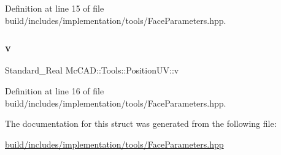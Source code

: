 Definition at line 15 of file build/includes/implementation/tools/\+Face\+Parameters.\+hpp.

\mbox{\label{structMcCAD_1_1Tools_1_1PositionUV_a01f73f82047d1bf01cbb494fde5451e5}} 
\subsubsection{\texorpdfstring{v}{v}}
{\footnotesize\ttfamily Standard\+\_\+\+Real Mc\+C\+A\+D\+::\+Tools\+::\+Position\+U\+V\+::v}



Definition at line 16 of file build/includes/implementation/tools/\+Face\+Parameters.\+hpp.



The documentation for this struct was generated from the following file\+:\begin{DoxyCompactItemize}
\item 
\hyperlink{build_2includes_2implementation_2tools_2FaceParameters_8hpp}{build/includes/implementation/tools/\+Face\+Parameters.\+hpp}\end{DoxyCompactItemize}
